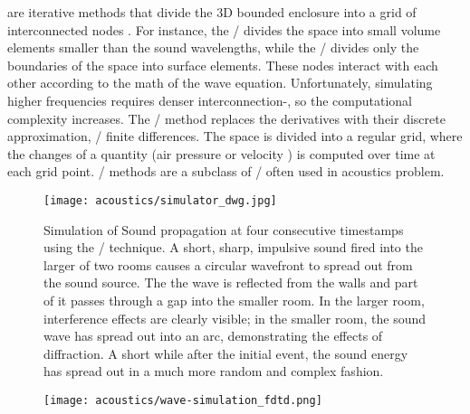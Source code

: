  are iterative methods that divide the 3D bounded enclosure into a grid of interconnected nodes
.
For instance, the \FEM/ divides the space into small volume elements smaller than the sound wavelengths,
while the \BEM/ divides only the boundaries of the space into surface elements.
These nodes interact with each other according to the math of the wave equation.
Unfortunately, simulating higher frequencies requires denser interconnection-, so the computational complexity increases.
The \FDTDf/ method replaces the derivatives with their discrete approximation, \ie/ finite differences.
The space is divided into a regular grid, where the changes of a quantity (air pressure or velocity ) is computed over time at each grid point.
\DWMf/ methods are a subclass of \FDTD/ often used in acoustics problem.

\begin{figure}[t]
    \begin{fullwidthfig}
        \centering
        \texttt{[image: acoustics/simulator\_dwg.jpg]}

        \caption{Simulation of Sound propagation at four consecutive timestamps using the \DWM/ technique.
        A short, sharp, impulsive sound fired into the larger of two rooms causes a circular wavefront to spread out from the sound source.
        The the wave is reflected from the walls and part of it passes through a gap into the smaller room.
        In the larger room, interference effects are clearly visible;
        in the smaller room, the sound wave has spread out into an arc, demonstrating the effects of diffraction.
        A short while after the initial event, the sound energy has spread out in a much more random and complex fashion.
        }
        \label{fig:acoustics:dwm}
    \end{fullwidthfig}

\end{figure}

\begin{figure}[t]
    \begin{fullwidthfig}
        \label{fig:acoustics:fdtd}
        \centering
        \texttt{[image: acoustics/wave-simulation\_fdtd.png]}
    \end{fullwidthfig}

    \vspace{-\baselineskip}\vspace{-\baselineskip}

\end{figure}

